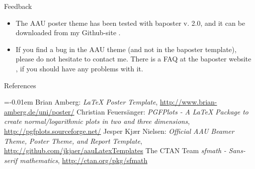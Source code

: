 \documentclass[a0paper,portrait]{baposter}
\begin{document}
\begin{poster}
\begin{posterbox}[name=feedback,column=2,below=problems]{Feedback}
  \begin{itemize}
    \item The AAU poster theme has been tested with baposter v. 2.0, and it can be downloaded from my Github-site \cite{jkngithub}.
    \item If you find a bug in the AAU theme (and not in the baposter template), please do not hesitate to contact me. There is a FAQ at the baposter website \cite{baposter}, if you should have any problems with it.
  \end{itemize}
\end{posterbox}

\begin{posterbox}[name=refs,column=2,below=feedback,above=bottom]{References}


\begin{thebibliography}{1}%
\itemsep=-0.01em%
\setlength{\baselineskip}{0.4em}%
 Brian Amberg: \emph{LaTeX Poster Template}, \url{http://www.brian-amberg.de/uni/poster/} 
 Christian Feuersänger: \emph{PGFPlots - A LaTeX Package to create normal/logarithmic plots in two and three dimensions}, \url{http://pgfplots.sourceforge.net/} 
 Jesper Kjær Nielsen: \emph{Official AAU Beamer Theme, Poster Theme, and Report Template}, \url{http://github.com/jkjaer/aauLatexTemplates}
 The CTAN Team  \emph{sfmath -  Sans-serif mathematics}, \url{http://ctan.org/pkg/sfmath}
\end{thebibliography}


%  
%   
\end{posterbox}

\end{poster}
\end{document}
